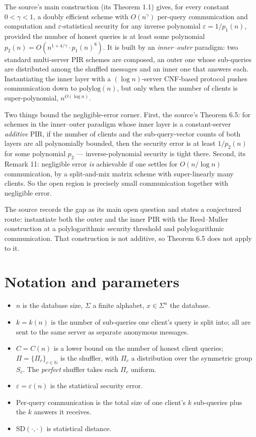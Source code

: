\documentclass{aicr-conjecture}
\newcommand{\Sig}{\Sigma}
\newcommand{\eps}{\varepsilon}
\newcommand{\SD}{\mathrm{SD}}
\begin{document}
The source's main construction (its Theorem 1.1) gives, for every
constant $0 < \gamma < 1$, a doubly efficient scheme with $O(n^{\gamma})$
per-query communication and computation and $\eps$-statistical security
for any inverse polynomial $\eps = 1/p_{1}(n)$, provided the number of
honest queries is at least some polynomial $p_{2}(n) = O(n^{1 + 4/\gamma}
\cdot p_{1}(n)^{8})$. It is built by an \emph{inner--outer} paradigm:
two standard multi-server PIR schemes are composed, an outer one whose
sub-queries are distributed among the shuffled messages and an inner one
that answers each. Instantiating the inner layer with a $(\log
n)$-server CNF-based protocol pushes communication down to
$\mathrm{polylog}(n)$, but only when the number of clients is
super-polynomial, $n^{O(\log n)}$.

Two things bound the negligible-error corner. First, the source's
Theorem 6.5: for schemes in the inner--outer paradigm whose inner layer
is a constant-server \emph{additive} PIR, if the number of clients and
the sub-query-vector counts of both layers are all polynomially bounded,
then the security error is at least $1/p_{2}(n)$ for some polynomial
$p_{2}$ --- inverse-polynomial security is tight there. Second, its
Remark 11: negligible error \emph{is} achievable if one settles for
$O(n/\log n)$ communication, by a split-and-mix matrix scheme with
super-linearly many clients. So the open region is precisely small
communication together with negligible error.

The source records the gap as its main open question and states a
conjectured route: instantiate both the outer and the inner PIR with the
Reed--Muller construction at a polylogarithmic security threshold and
polylogarithmic communication. That construction is not additive, so
Theorem 6.5 does not apply to it.

\section{Notation and parameters}\label{sec:notation}

\begin{itemize}[nosep]
  \item $n$ is the database size, $\Sig$ a finite alphabet, $x \in
    \Sig^{n}$ the database.
  \item $k = k(n)$ is the number of sub-queries one client's query is
    split into; all are sent to the same server as separate anonymous
    messages.
  \item $C = C(n)$ is a lower bound on the number of honest client
    queries; $\Pi = \{\Pi_{c}\}_{c \in \mathbb{N}}$ is the shuffler,
    with $\Pi_{c}$ a distribution over the symmetric group $S_{c}$. The
    \emph{perfect} shuffler takes each $\Pi_{c}$ uniform.
  \item $\eps = \eps(n)$ is the statistical security error.
  \item Per-query communication is the total size of one client's $k$
    sub-queries plus the $k$ answers it receives.
  \item $\SD(\cdot,\cdot)$ is statistical distance.
\end{itemize}
\end{document}
